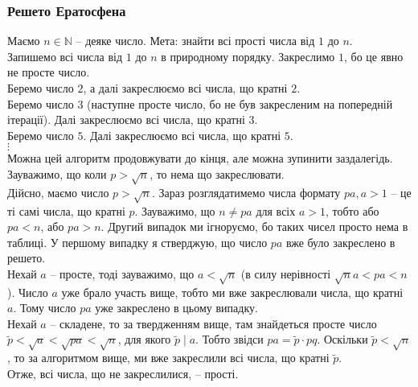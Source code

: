 \documentclass[a4paper, 14pt]{extarticle}
\theoremstyle{theoremdd}
\theoremstyle{theoremdd}
\theoremstyle{theoremdd}
\theoremstyle{theoremdd}
\theoremstyle{theoremdd}
\theoremstyle{theoremdd}
\theoremstyle{theoremdd}
\theoremstyle{theoremdd}
\begin{document}
\subsubsection*{Решето Ератосфена}
Маємо $n \in \mathbb{N}$ -- деяке число. Мета: знайти всі прості числа від $1$ до $n$.\\
Запишемо всі числа від $1$ до $n$ в природному порядку. Закреслимо $1$, бо це явно не просте число.\\
Беремо число $2$, а далі закреслюємо всі числа, що кратні $2$.\\
Беремо число $3$ (наступне просте число, бо не був закресленим на попередній ітерації). Далі закреслюємо всі числа, що кратні $3$.\\
Беремо число $5$. Далі закреслюємо всі числа, що кратні $5$.\\
$\vdots$\\
Можна цей алгоритм продовжувати до кінця, але можна зупинити заздалегідь. Зауважимо, що коли $p > \sqrt{n}$, то нема що закреслювати.\\
Дійсно, маємо число $p > \sqrt{n}$. Зараз розглядатимемо числа формату $pa, a > 1$ -- це ті самі числа, що кратні $p$. Зауважимо, що $n \neq pa$ для всіх $a > 1$, тобто або $pa < n$, або $pa > n$. Другий випадок ми ігноруємо, бо таких чисел просто нема в таблиці. У першому випадку я стверджую, що число $pa$ вже було закреслено в решето. \\
Нехай $a$ -- просте, тоді зауважимо, що $a < \sqrt{n}$ (в силу нерівності $\sqrt{n} a < pa < n$). Число $a$ уже брало участь вище, тобто ми вже закреслювали числа, що кратні $a$. Тому число $pa$ уже закреслено в цьому випадку.\\
Нехай $a$ -- складене, то за твердженням вище, там знайдеться просте число $\tilde{p} < \sqrt{a} < \sqrt{pa} < \sqrt{n}$, для якого $\tilde{p} \mid a$. Тобто звідси $pa = \tilde{p} \cdot pq$. Оскільки $\tilde{p} < \sqrt{n}$, то за алгоритмом вище, ми вже закреслили всі числа, що кратні $\tilde{p}$.
\bigskip \\
Отже, всі числа, що не закреслилися, -- прості.
\end{document}
